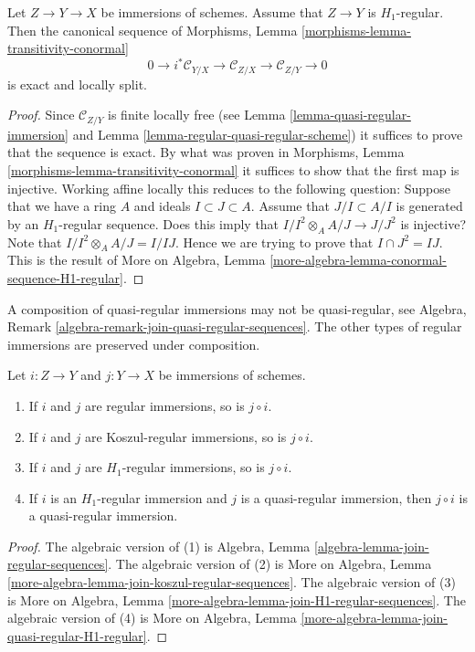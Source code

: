 \begin{lemma}
\label{lemma-transitivity-conormal-quasi-regular}
Let $Z \to Y \to X$ be immersions of schemes. Assume that
$Z \to Y$ is $H_1$-regular. Then the canonical sequence of
Morphisms, Lemma \ref{morphisms-lemma-transitivity-conormal}
$$
0 \to i^*\mathcal{C}_{Y/X} \to
\mathcal{C}_{Z/X} \to
\mathcal{C}_{Z/Y} \to 0
$$
is exact and locally split.
\end{lemma}

\begin{proof}
Since $\mathcal{C}_{Z/Y}$ is finite locally free (see
Lemma \ref{lemma-quasi-regular-immersion}
and
Lemma \ref{lemma-regular-quasi-regular-scheme})
it suffices to prove that the sequence is exact. By what was proven in
Morphisms, Lemma \ref{morphisms-lemma-transitivity-conormal}
it suffices to show that the first map is injective.
Working affine locally this reduces to the following question:
Suppose that we have a ring $A$ and ideals $I \subset J \subset A$.
Assume that $J/I \subset A/I$ is generated by an $H_1$-regular sequence.
Does this imply that $I/I^2 \otimes_A A/J \to J/J^2$ is injective?
Note that $I/I^2 \otimes_A A/J = I/IJ$. Hence we are trying to prove
that $I \cap J^2 = IJ$. This is the result of
More on Algebra, Lemma \ref{more-algebra-lemma-conormal-sequence-H1-regular}.
\end{proof}

\noindent
A composition of quasi-regular immersions may not be quasi-regular, see
Algebra, Remark \ref{algebra-remark-join-quasi-regular-sequences}.
The other types of regular immersions are preserved under composition.

\begin{lemma}
\label{lemma-composition-regular-immersion}
Let $i : Z \to Y$ and $j : Y \to X$ be immersions of schemes.
\begin{enumerate}
\item If $i$ and $j$ are regular immersions, so is $j \circ i$.
\item If $i$ and $j$ are Koszul-regular immersions, so is $j \circ i$.
\item If $i$ and $j$ are $H_1$-regular immersions, so is $j \circ i$.
\item If $i$ is an $H_1$-regular immersion and $j$ is a quasi-regular
immersion, then $j \circ i$ is a quasi-regular immersion.
\end{enumerate}
\end{lemma}

\begin{proof}
The algebraic version of (1) is
Algebra, Lemma \ref{algebra-lemma-join-regular-sequences}.
The algebraic version of (2) is
More on Algebra, Lemma \ref{more-algebra-lemma-join-koszul-regular-sequences}.
The algebraic version of (3) is
More on Algebra, Lemma \ref{more-algebra-lemma-join-H1-regular-sequences}.
The algebraic version of (4) is
More on Algebra, Lemma \ref{more-algebra-lemma-join-quasi-regular-H1-regular}.
\end{proof}

